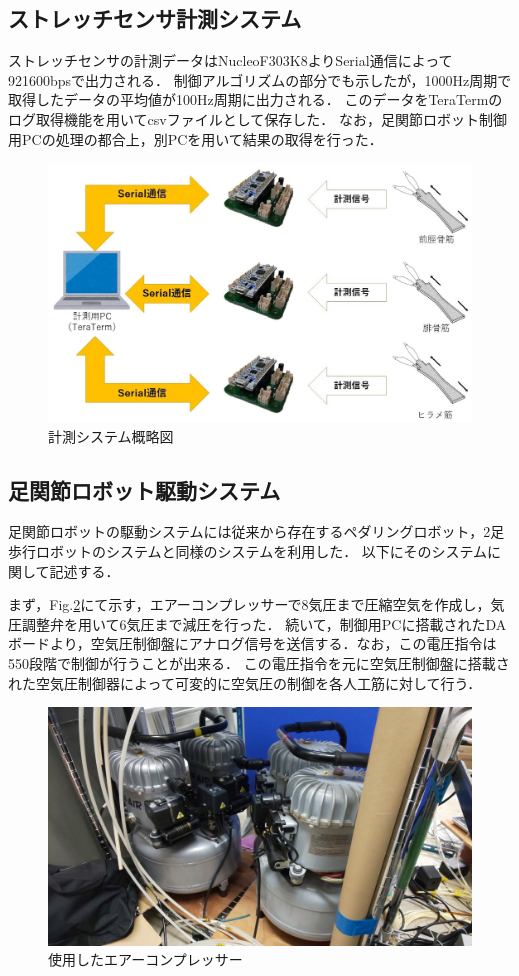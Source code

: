 \subsection{ストレッチセンサ計測システム}
ストレッチセンサの計測データはNucleoF303K8よりSerial通信によって921600bpsで出力される．
制御アルゴリズムの部分でも示したが，1000Hz周期で取得したデータの平均値が100Hz周期に出力される．
このデータをTeraTermのログ取得機能を用いてcsvファイルとして保存した．
なお，足関節ロボット制御用PCの処理の都合上，別PCを用いて結果の取得を行った．
\begin{figure}[h]
    \begin{center}
        \includegraphics[width=0.78\columnwidth,clip]{./3_analysis/getSystem.eps}
        \caption{計測システム概略図}
        \label{getSystem}
    \end{center}
\end{figure}

\subsection{足関節ロボット駆動システム}
足関節ロボットの駆動システムには従来から存在するペダリングロボット，2足歩行ロボットのシステムと同様のシステムを利用した．
以下にそのシステムに関して記述する．

まず，Fig.\ref{fig:compressor}にて示す，エアーコンプレッサーで8気圧まで圧縮空気を作成し，気圧調整弁を用いて6気圧まで減圧を行った．
続いて，制御用PCに搭載されたDAボードより，空気圧制御盤にアナログ信号を送信する．なお，この電圧指令は550段階で制御が行うことが出来る．
この電圧指令を元に空気圧制御盤に搭載された空気圧制御器によって可変的に空気圧の制御を各人工筋に対して行う．

\newpage

\begin{figure}[h]
    \begin{center}
     \includegraphics[width=0.65\columnwidth,clip]{./3_analysis/compressor.eps}
     \caption{使用したエアーコンプレッサー}
     \label{fig:compressor}
    \end{center}
\end{figure}

